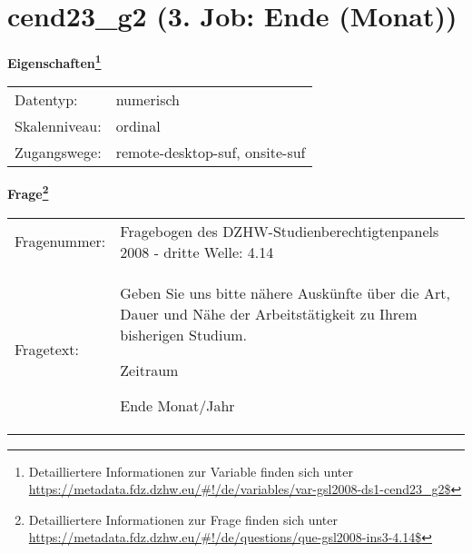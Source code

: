
    \setcounter{footnote}{0}

    \vspace*{-1.8cm}
	\section{cend23\_g2 (3. Job: Ende (Monat))}
	\label{section:cend23_g2}



    \vspace*{0.5cm}
    \noindent\textbf{Eigenschaften\footnote{Detailliertere Informationen zur Variable finden sich unter
		\url{https://metadata.fdz.dzhw.eu/\#!/de/variables/var-gsl2008-ds1-cend23_g2$}}}\\
	\begin{tabularx}{\hsize}{@{}lX}
	Datentyp: & numerisch \\
	Skalenniveau: & ordinal \\
	Zugangswege: &
	  remote-desktop-suf, 
	  onsite-suf
 \\
    \end{tabularx}



				\vspace*{0.5cm}
                \noindent\textbf{Frage\footnote{Detailliertere Informationen zur Frage finden sich unter
		              \url{https://metadata.fdz.dzhw.eu/\#!/de/questions/que-gsl2008-ins3-4.14$}}}\\
				\begin{tabularx}{\hsize}{@{}lX}
					Fragenummer: &
					  Fragebogen des DZHW-Studienberechtigtenpanels 2008 - dritte Welle:
					  4.14
 \\
					Fragetext: & Geben Sie uns bitte nähere Auskünfte über die Art, Dauer und Nähe der Arbeitstätigkeit zu Ihrem bisherigen Studium.\par  Zeitraum\par  Ende Monat/Jahr \\
				\end{tabularx}





